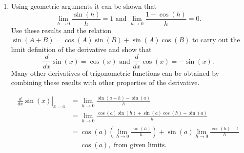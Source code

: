 \documentclass[10pt]{memoir}
\newcounter{pass}
\begin{document}
\begin{enumerate}
\item
Using geometric arguments it can be shown that
$$ \lim_{h \to 0} \frac{\sin(h)}{h} = 1 \text{ and } \lim_{h \to 0} \frac{1-\cos(h)}{h} = 0.$$
Use these results and the relation $\sin(A+B) = \cos(A)\sin(B) + \sin(A)\cos(B)$ to carry out the limit definition of the derivative and show that
$$\frac{d}{dx} \sin(x) = \cos(x) \text{ and } \frac{d}{dx}{ \cos(x)} = -\sin(x).$$
Many other derivatives of trigonometric functions can be obtained by combining these results with other properties of the derivative.
\begin{solution}
\begin{align*}
\left. \frac{d}{dx} \sin(x) \right |_{x=a}
&= \lim_{h \to 0} \frac{\sin(a+h) - \sin(a)}{h}\\
&= \lim_{h \to 0} \frac{\cos(a)\sin(h) + \sin(a)\cos(h) - \sin(a)}{h}\\
&=\cos(a) \left ( \lim_{h \to 0} \frac{\sin(h)}{h} \right ) + \sin(a) \lim_{h \to 0} \frac{\cos(h) - 1}{h}\\
&= \cos(a), \text{ from given limits}.
\end{align*}

\end{solution}
\setcounter{pass}{\value{enumi}}
\end{enumerate}

%
%
%
%
%
%
\end{document}
